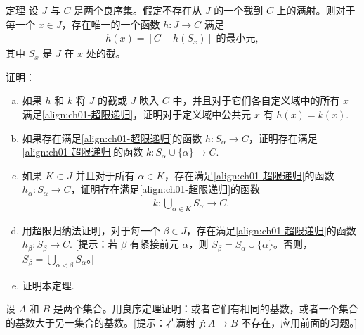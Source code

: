 \documentclass[../../main.tex]{subfiles}
\begin{document}
\begin{exercise}\label{exercise:ch01-良序集-10}
定理 设 $J$ 与 $C$ 是两个良序集。假定不存在从 $J$ 的一个截到 $C$ 上的满射。则对于每一个 $x \in J$，存在唯一的一个函数 $h: J \longrightarrow C$ 满足
\begin{align}
h(x) = [C - h(S_{x})] \text{ 的最小元},\label{align:ch01-超限递归}
\end{align}
其中 $S_{x}$ 是 $J$ 在 $x$ 处的截。

证明：
\begin{enumerate}[(a)]
\item 如果 $h$ 和 $k$ 将 $J$ 的截或 $J$ 映入 $C$ 中，并且对于它们各自定义域中的所有 $x$ 满足\eqref{align:ch01-超限递归}，证明对于定义域中公共元 $x$ 有 $h(x) = k(x)$.
\item 如果存在满足\eqref{align:ch01-超限递归}的函数 $h: S_{\alpha} \longrightarrow C$，证明存在满足\eqref{align:ch01-超限递归}的函数 $k: S_{\alpha} \cup \{\alpha\} \longrightarrow C$.
\item 如果 $K \subset J$ 并且对于所有 $\alpha \in K$，存在满足\eqref{align:ch01-超限递归}的函数 $h_{\alpha}: S_{\alpha} \longrightarrow C$，证明存在满足\eqref{align:ch01-超限递归}的函数
\begin{align*}
k: \bigcup_{\alpha \in K} S_{\alpha} \longrightarrow C.
\end{align*}
\item 用超限归纳法证明，对于每一个 $\beta \in J$，存在满足\eqref{align:ch01-超限递归}的函数 $h_{\beta}: S_{\beta} \longrightarrow C$. [提示：若 $\beta$ 有紧接前元 $\alpha$，则 $S_{\beta} = S_{\alpha} \cup \{\alpha\}$。否则，$S_{\beta} = \bigcup_{\alpha < \beta} S_{\alpha}$。]
\item 证明本定理.
\end{enumerate}
\end{exercise}

\begin{exercise}\label{exercise:ch01-良序集-11}
设 $A$ 和 $B$ 是两个集合。用良序定理证明：或者它们有相同的基数，或者一个集合的基数大于另一集合的基数。[提示：若满射 $f: A \longrightarrow B$ 不存在，应用前面的习题。]
\end{exercise}
\end{document}
